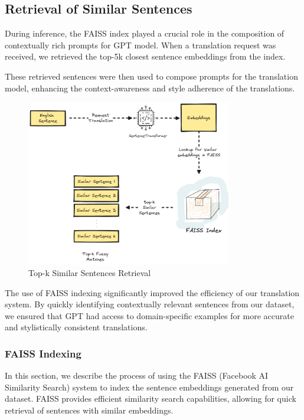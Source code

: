 \documentclass[12pt]{article}
\begin{document}
\subsection{Retrieval of Similar Sentences}

During inference, the FAISS index played a crucial role in the composition of contextually rich prompts for GPT model. When a translation request was received, we retrieved the top-5k closest sentence embeddings from the index. 

These retrieved sentences were then used to compose prompts for the translation model, enhancing the context-awareness and style adherence of the translations.

\begin{figure}[h]
	\centering
	\includegraphics[width=0.8\textwidth]{assets/Fuzzy_matches.png}
	\caption{Top-k Similar Sentences Retrieval}
	\label{fig:ktopsimilarsentences}
\end{figure}


The use of FAISS indexing significantly improved the efficiency of our translation system. By quickly identifying contextually relevant sentences from our dataset, we ensured that GPT had access to domain-specific examples for more accurate and stylistically consistent translations.


\subsubsection{FAISS Indexing}

In this section, we describe the process of using the FAISS (Facebook AI Similarity Search) system to index the sentence embeddings generated from our dataset. FAISS provides efficient similarity search capabilities, allowing for quick retrieval of sentences with similar embeddings.
\end{document}
